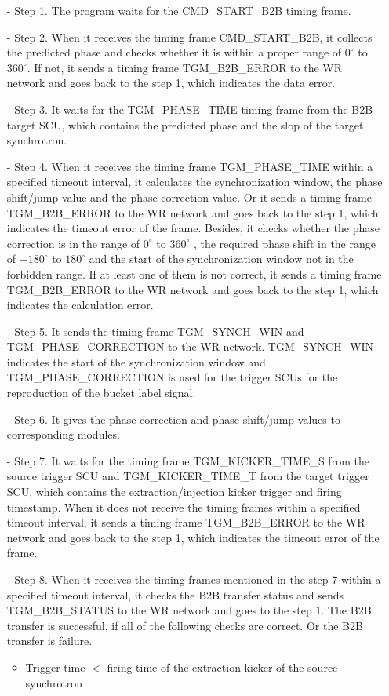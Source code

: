 \begin{itemize}
 	\begin{itemize}
		\item[-]Step 1. The program waits for the CMD\_START\_B2B timing frame.
 		\item[-]Step 2. When it receives the timing frame CMD\_START\_B2B, it collects the predicted phase and checks whether it is within a proper range of $0^\circ$ to $360^\circ$. If not, it sends a timing frame TGM\_B2B\_ERROR to the WR network and goes back to the step 1, which indicates the data error.
		\item[-]Step 3. It waits for the TGM\_PHASE\_TIME timing frame from the B2B target SCU, which contains the predicted phase and the slop of the target synchrotron.
		\item[-]Step 4. When it receives the timing frame TGM\_PHASE\_TIME within a specified timeout interval, it calculates the synchronization window, the phase shift/jump value and the phase correction value. Or it sends a timing frame TGM\_B2B\_ERROR to the WR network and goes back to the step 1, which indicates the timeout error of the frame. Besides, it checks whether the phase correction is in the range of $0^\circ$ to $360^\circ$ , the required phase shift in the range of $-180^\circ$ to $180^\circ$ and the start of the synchronization window not in the forbidden range. If at least one of them is not correct, it sends a timing frame TGM\_B2B\_ERROR to the WR network and goes back to the step 1, which indicates the calculation error. 
		\item[-]Step 5. It sends the timing frame TGM\_SYNCH\_WIN and TGM\_PHASE\_CORRECTION to the WR network. TGM\_SYNCH\_WIN indicates the start of the synchronization window and TGM\_PHASE\_CORRECTION is used for the trigger SCUs for the reproduction of the bucket label signal.
		\item[-]Step 6. It gives the phase correction and phase shift/jump values to corresponding modules.
		\item[-]Step 7. It waits for the timing frame TGM\_KICKER\_TIME\_S from the source trigger SCU and TGM\_KICKER\_TIME\_T from the target trigger SCU, which contains the extraction/injection kicker trigger and firing timestamp. When it does not receive the timing frames within a specified timeout interval, it sends a timing frame TGM\_B2B\_ERROR to the WR network and goes back to the step 1, which indicates the timeout error of the frame.
		\item[-]Step 8. When it receives the timing frames mentioned in the step 7 within a specified timeout interval, it checks the B2B transfer status and sends TGM\_B2B\_STATUS to the WR network and goes to the step 1. The B2B transfer is successful, if all of the following checks are correct. Or the B2B transfer is failure. 
\begin{itemize}
	\item Trigger time $<$ firing time of the extraction kicker of the source synchrotron


\end{itemize}
\end{itemize}
\end{itemize}
